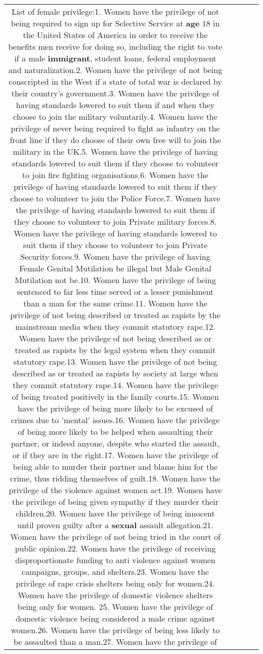 \documentclass[11pt]{article}
\newlength\mylength
\begin{document}
\begin{center}
\begin{longtable}{|C{.65\mylength}|C{.30\mylength}|C{.12\mylength}|C{.12\mylength}|C{.12\mylength}|}
  \small List of female privilege:1. Women have the privilege of not being required to sign up for Selective Service at \textbf{age} 18 in the United States of America in order to receive the benefits men receive for doing so, including the right to vote if a male \textbf{immigrant}, student loans, federal employment and naturalization.2. Women have the privilege of not being conscripted in the West if a state of total war is declared by their country's government.3. Women have the privilege of having standards lowered to suit them if and when they choose to join the military voluntarily.4. Women have the privilege of never being required to fight as infantry on the front line if they do choose of their own free will to join the military in the UK.5.  Women have the privilege of having standards lowered to suit them if they choose to volunteer to join fire fighting organisations.6. Women have the privilege of having standards lowered to suit them if they choose to volunteer to join the Police Force.7. Women have the privilege of having standards lowered to suit them if they choose to volunteer to join Private military forces.8. Women have the privilege of having standards lowered to suit them if they choose to volunteer to join Private Security forces.9. Women have the privilege of having Female Genital Mutilation be illegal but Male Genital Mutilation not be.10. Women have the privilege of being sentenced to far less time served or a lesser punishment than a man for the same crime.11. Women have the privilege of not being described or treated as rapists by the mainstream media when they commit statutory rape.12. Women have the privilege of  not being described as or treated as rapists by the legal system when they commit statutory rape.13. Women have the privilege of not being described as or treated as rapists by society at large when they commit statutory rape.14. Women have the privilege of being treated positively in the family courts.15. Women have the privilege of being more likely to be excused of crimes due to 'mental' issues.16. Women have the privilege of being more likely to be helped when assaulting their partner, or indeed anyone, despite who started the assault, or if they are in the right.17. Women have the privilege of being able to murder their partner and blame him for the crime, thus ridding themselves of guilt.18. Women have the privilege of the violence against women act.19. Women have the privilege of being given sympathy if they murder their children.20. Women have the privilege of being innocent until proven guilty after a \textbf{sexual} assault allegation.21. Women have the privilege of not being tried in the court of public opinion.22. Women have the privilege of receiving disproportionate funding to anti violence against women campaigns, groups, and shelters.23. Women have the privilege of rape crisis shelters being only for women.24. Women have the privilege of domestic violence shelters being only for women. 25. Women have the privilege of domestic violence being considered a male crime against women.26. Women have the privilege of being less likely to be assaulted than a man.27. Women have the privilege of 
\end{longtable}
\end{center}
\end{document}
